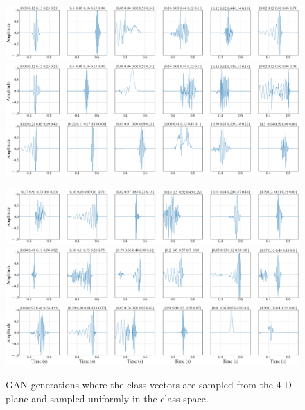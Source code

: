 \documentclass[12pt]{iopart}
\begin{document}
\begin{figure}
    \centering
    \includegraphics[width=\textwidth]{figures/generations/simplex_sample1.png}
    \includegraphics[width=\textwidth]{figures/generations/simplex_sample2.png}
    \includegraphics[width=\textwidth]{figures/generations/simplex_sample3.png}

    \includegraphics[width=\textwidth]{figures/generations/uniform_sample3.png}
    \includegraphics[width=\textwidth]{figures/generations/uniform_sample2.png}
    \includegraphics[width=\textwidth]{figures/generations/uniform_sample1.png}
    \caption{GAN generations where the class vectors are sampled from the 4-D plane and sampled uniformly in the class space.}
    \label{fig:unmodelled_samples}
\end{figure}
\end{document}
